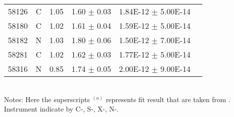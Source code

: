 \begin{table*}
\begin{tabular}{lccccc}
58126 & C & 1.05 & 1.60  $\pm$  0.03 & 1.84E-12  $\pm$  5.00E-14 &  \\ 
58180 & C & 1.02 & 1.61  $\pm$  0.04 & 1.59E-12  $\pm$  5.00E-14 &  \\ 
58182 & N & 1.03 & 1.80  $\pm$  0.06 & 1.50E-12  $\pm$  7.00E-14 &  \\ 
58281 & C & 1.02 & 1.62  $\pm$  0.03 & 1.77E-12  $\pm$  5.00E-14 &  \\ 
58316 & N & 0.85 & 1.74  $\pm$  0.05 & 2.00E-12  $\pm$  9.00E-14 &  \\  \hline
\end{tabular}\\
Notes: Here the superscripts $^{(a)}$ represents fit result that are taken from \citet{2017A&A...607L...9K}. Instrument indicate by C-\chandra, S-\swift, X-\xmm, N-\nustar. 
\end{table*}